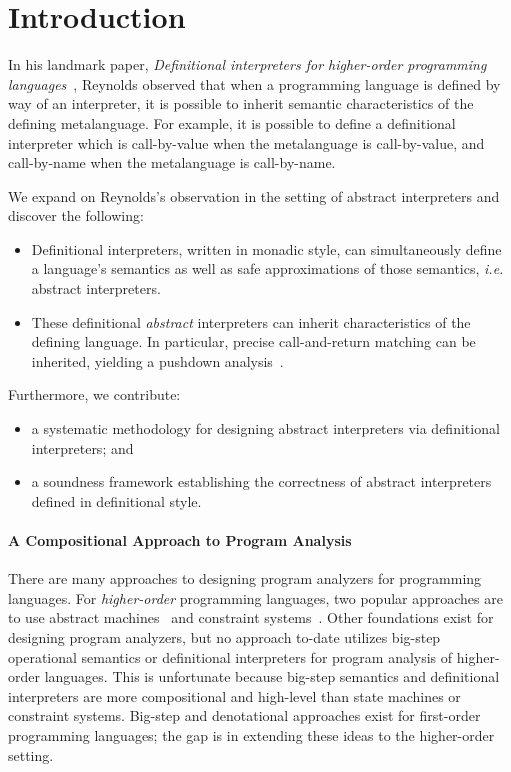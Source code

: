 \section{Introduction}

In his landmark paper, \emph{Definitional interpreters for higher-order
programming languages}~\cite{dvanhorn:reynolds-acm72}, Reynolds observed that
when a programming language is defined by way of an interpreter, it is possible
to inherit semantic characteristics of the defining metalanguage. For example,
it is possible to define a definitional interpreter which is call-by-value when
the metalanguage is call-by-value, and call-by-name when the metalanguage is
call-by-name.

We expand on Reynolds's observation in the setting of abstract interpreters and
discover the following:
\begin{itemize}
\item Definitional interpreters, written in monadic style, can simultaneously
  define a language's semantics as well as safe approximations of those
  semantics, \emph{i.e.} abstract interpreters.
\item These definitional \emph{abstract} interpreters can inherit
  characteristics of the defining language.  In particular, precise
  call-and-return matching can be inherited, yielding a pushdown
  analysis~\cite{dvanhorn:Earl2010Pushdown,local:vardoulakis-diss12}.
\end{itemize}
Furthermore, we contribute:
\begin{itemize}
\item a systematic methodology for designing abstract interpreters via
  definitional interpreters; and
\item a soundness framework establishing the correctness of abstract
  interpreters defined in definitional style.
\end{itemize}

\paragraph{A Compositional Approach to Program Analysis}
There are many approaches to designing program analyzers for programming
languages. For \emph{higher-order} programming languages, two popular
approaches are to use abstract machines~\cite{dvanhorn:VanHorn2010Abstracting}
and constraint systems~\cite{dvanhorn:Neilson:1999}. Other foundations exist
for designing program analyzers, but no approach to-date utilizes big-step
operational semantics or definitional interpreters for program analysis of
higher-order languages. This is unfortunate because big-step semantics and
definitional interpreters are more compositional and high-level than state
machines or constraint systems. Big-step and denotational approaches exist for
first-order programming languages; the gap is in extending these ideas to the
higher-order setting.

